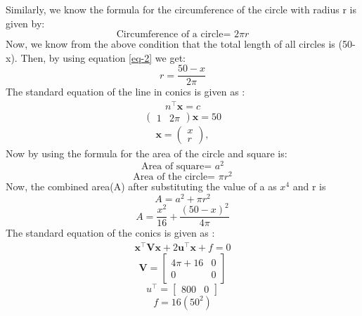 \documentclass[journal,12pt,twocolumn]{IEEEtran}
\let\vec\mathbf
\newcommand{\myvec}[1]{\ensuremath{\begin{pmatrix}#1\end{pmatrix}}}
\begin{document}
Similarly, we know the formula for the circumference of the circle with radius r is given by:
\begin{equation}
\text{Circumference of a circle= }2\pi r
\label{eq-2}
\end{equation} 
Now, we know from the above condition that the total length of all circles is (50-x).
Then, by using equation \ref{eq-2} we get:
\begin{equation}
r=\frac{50-x}{2\pi}
\end{equation}
The standard equation of the line in conics is given as :
\begin{align}
n^\top \vec{x} = c
\end{align}
\begin{equation}
\begin{pmatrix}1 & 2\pi\end{pmatrix}  \vec{x} = 50
\end{equation}
\begin{align}
\vec{x}  = \myvec{x\\r},
\end{align}
Now by using the formula for the area of the circle and square is:
\begin{equation}
\text{Area of square= }a^2
\end{equation}
\begin{equation}
\text{Area of the circle= }\pi r^2
\end{equation}
Now, the combined area(A) after substituting the value of a as $x^4$ and r is
\begin{equation}
A=a^2+\pi r^2
\end{equation}
\begin{equation}
A = \frac{x^2}{16} + \frac{(50-x)^2}{4\pi}
\end{equation}
The standard equation of the conics is given as :
\begin{align}
\vec{x}^{\top}\vec{V}\vec{x}+2\vec{u}^{\top}\vec{x}+f=0
\end{align}
\begin{equation}
\vec{V} = \begin{bmatrix}
4\pi+16 & 0 \\
0 & 0
\end{bmatrix}
\end{equation}
\begin{equation}
u^\top = \begin{bmatrix}
800 & 0
\end{bmatrix}
\end{equation}
\begin{equation}
f = 16(50^2)
\end{equation}
\end{document}
